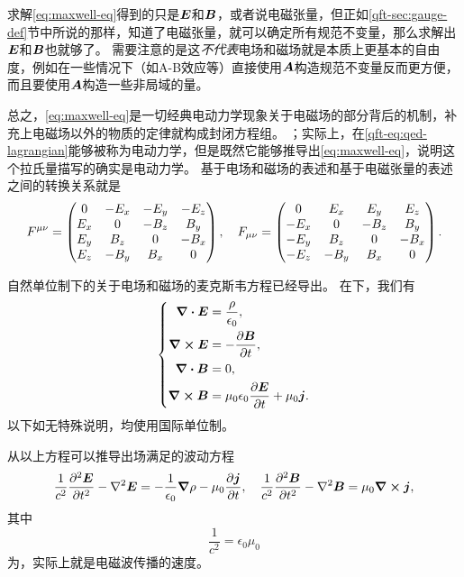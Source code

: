 求解\eqref{eq:maxwell-eq}得到的只是$\vb*{E}$和$\vb*{B}$，或者说电磁张量，但正如\ref{qft-sec:gauge-def}节中所说的那样，知道了电磁张量，就可以确定所有规范不变量，那么求解出$\vb*{E}$和$\vb*{B}$也就够了。
需要注意的是这\emph{不代表}电场和磁场就是本质上更基本的自由度，例如在一些情况下（如A-B效应等）直接使用$\vb*{A}$构造规范不变量反而更方便，而且要使用$\vb*{A}$构造一些非局域的量。

总之，\eqref{eq:maxwell-eq}是一切经典电动力学现象关于电磁场的部分背后的机制，补充上电磁场以外的物质的定律就构成封闭方程组。
；实际上，在\eqref{qft-eq:qed-lagrangian}能够被称为电动力学，但是既然它能够推导出\eqref{eq:maxwell-eq}，说明这个拉氏量描写的确实是电动力学。
基于电场和磁场的表述和基于电磁张量的表述之间的转换关系就是
\begin{equation}
    F^{\mu \nu} = \pmqty{
        0 & -E_x & -E_y & -E_z \\
        E_x & 0 & -B_z & B_y \\
        E_y & B_z & 0 & -B_x \\
        E_z & -B_y & B_x & 0
    }, \quad F_{\mu \nu} = \pmqty{
        0 & E_x & E_y & E_z \\
        -E_x & 0 & -B_z & B_y \\
        -E_y & B_z & 0 & -B_x \\
        -E_z & -B_y & B_x & 0
    }.
\end{equation}

自然单位制下的关于电场和磁场的麦克斯韦方程已经导出。
在下，我们有
\begin{equation}
    \left\{
        \begin{aligned}
            \div{\vb*{E}} &= \frac{\rho}{\epsilon_0}, \\
            \curl{\vb*{E}} &= - \pdv{\vb*{B}}{t}, \\
            \div{\vb*{B}} &= 0, \\
            \curl{\vb*{B}} &= \mu_0 \epsilon_0 \pdv{\vb*{E}}{t} + \mu_0 \vb*{j}.
        \end{aligned}
    \right.
    \label{eq:maxwell-eq-si}
\end{equation}
以下如无特殊说明，均使用国际单位制。

从以上方程可以推导出场满足的波动方程
\begin{equation}
    \frac{1}{c^2} \pdv[2]{\vb*{E}}{t} - \laplacian{\vb*{E}} = - \frac{1}{\epsilon_0} \grad{\rho} - \mu_0 \pdv{\vb*{j}}{t} , \quad \frac{1}{c^2} \pdv[2]{\vb*{B}}{t} - \laplacian{\vb*{B}} = \mu_0 \curl{\vb*{j}},
    \label{eq:wave-eq-general}
\end{equation}
其中
\begin{equation}
    \frac{1}{c^2} = \epsilon_0 \mu_0
\end{equation}
为，实际上就是电磁波传播的速度。

